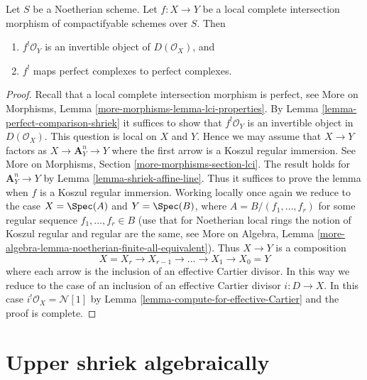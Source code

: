 \begin{lemma}
\label{lemma-lci-shriek}
Let $S$ be a Noetherian scheme. Let $f : X \to Y$ be a local complete
intersection morphism of compactifyable schemes over $S$. Then
\begin{enumerate}
\item $f^!\mathcal{O}_Y$ is an invertible object of $D(\mathcal{O}_X)$, and
\item $f^!$ maps perfect complexes to perfect complexes.
\end{enumerate}
\end{lemma}

\begin{proof}
Recall that a local complete intersection morphism is perfect, see
More on Morphisms, Lemma \ref{more-morphisms-lemma-lci-properties}.
By Lemma \ref{lemma-perfect-comparison-shriek} it suffices to show
that $f^!\mathcal{O}_Y$ is an invertible object in $D(\mathcal{O}_X)$.
This question is local on $X$ and $Y$. Hence we may assume that $X \to Y$
factors as $X \to \mathbf{A}^n_Y \to Y$ where the first arrow is a
Koszul regular immersion. See More on Morphisms, Section
\ref{more-morphisms-section-lci}.
The result holds for $\mathbf{A}^n_Y \to Y$
by Lemma \ref{lemma-shriek-affine-line}. Thus it suffices to prove
the lemma when $f$ is a Koszul regular immersion.
Working locally once again we reduce to the case
$X = \Spec(A)$ and $Y = \Spec(B)$, where $A = B/(f_1, \ldots, f_r)$
for some regular sequence $f_1, \ldots, f_r \in B$
(use that for Noetherian local rings the notion of Koszul
regular and regular are the same, see
More on Algebra, Lemma
\ref{more-algebra-lemma-noetherian-finite-all-equivalent}).
Thus $X \to Y$ is a composition
$$
X = X_r \to X_{r - 1} \to \ldots \to X_1 \to X_0 = Y
$$
where each arrow is the inclusion of an effective Cartier divisor.
In this way we reduce to the case of an inclusion of an effective
Cartier divisor $i : D \to X$. In this case
$i^!\mathcal{O}_X = \mathcal{N}[1]$ by
Lemma \ref{lemma-compute-for-effective-Cartier} and the proof is complete.
\end{proof}






\section{Upper shriek algebraically}
\label{section-relative-dualizing-complex-algebraic}

